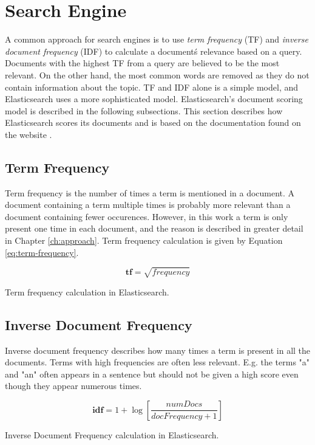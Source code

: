 \section{Search Engine}
A common approach for search engines is to use \textit{term frequency} (TF) and \textit{inverse document frequency} (IDF) to calculate a document\'s relevance based on a query.
Documents with the highest TF from a query are believed to be the most relevant.
On the other hand, the most common words are removed as they do not contain information about the topic.
TF and IDF alone is a simple model, and Elasticsearch uses a more sophisticated model.
Elasticsearch's document scoring model is described in the following subsections.
This section describes how Elasticsearch scores its documents and is based on the documentation found on the website \cite{elasticsearch-scoring}.

\subsection{Term Frequency}
Term frequency is the number of times a term is mentioned in a document.
A document containing a term multiple times is probably more relevant than a document containing fewer occurences.
However, in this work a term is only present one time in each document, and the reason is described in greater detail in Chapter \ref{ch:approach}.
Term frequency calculation is given by Equation \ref{eq:term-frequency}.

\begin{cequation}[H]
	\begin{equation}
		\mathbf{tf} = \sqrt{frequency}
	\end{equation}
	\caption{Term frequency calculation in Elasticsearch.}
  \label{eq:term-frequency}
\end{cequation}

\subsection{Inverse Document Frequency}
Inverse document frequency describes how many times a term is present in all the documents.
Terms with high frequencies are often less relevant.
E.g. the terms "a" and "an" often appears in a sentence but should not be given a high score even though they appear numerous times.
\begin{cequation}[H]
	\begin{equation}
		\mathbf{idf} = 1 + \log{[\frac{numDocs}{docFrequency + 1}]}
	\end{equation}
	\caption{Inverse Document Frequency calculation in Elasticsearch.}
  \label{eq:idf}
\end{cequation}

